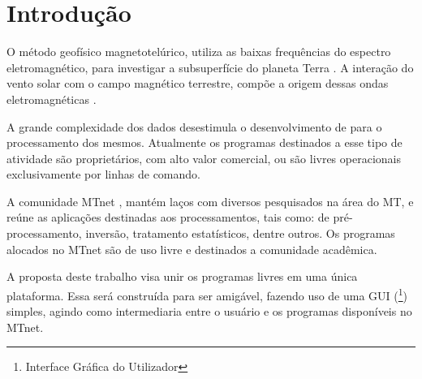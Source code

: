 \chapter{Introdução}
    
    O método geofísico magnetotelúrico, utiliza as baixas frequências do espectro eletromagnético, para investigar a subsuperfície do planeta Terra \cite{cagniard1953basic}. A interação do vento solar com o campo magnético terrestre, compõe a origem dessas ondas eletromagnéticas \cite{vozoff1991magnetotelluric}.  

    
    A grande complexidade dos dados \mt desestimula o desenvolvimento de  para o processamento dos mesmos. Atualmente os programas destinados a esse tipo de atividade são proprietários, com alto valor comercial, ou são livres operacionais exclusivamente por linhas de comando.  
    
    A comunidade MTnet \cite{mtnet}, mantém laços com diversos pesquisados na área do MT, e reúne as aplicações destinadas aos processamentos, tais como:  de pré-processamento, inversão, tratamento estatísticos, dentre outros. Os programas alocados no MTnet são de uso livre e destinados a comunidade acadêmica.
    
    
    
    
    A proposta deste trabalho visa unir os programas livres em uma única plataforma. Essa será  construída para ser amigável, fazendo uso de uma GUI (\footnote{Interface Gráfica do Utilizador}) simples, agindo como intermediaria entre o usuário e os programas disponíveis no MTnet. 
    
